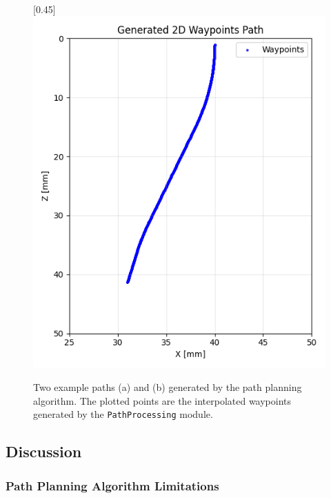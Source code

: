 \begin{figure}[H]
\begin{subcaptionbox}{\label{fig:right}}[0.45\linewidth]
        {\includegraphics[width=\linewidth]{images/waypoints/Figure_1.png}}
    \end{subcaptionbox}
    \caption{Two example paths (a) and (b) generated by the path planning algorithm. The plotted points are the interpolated waypoints generated by the \texttt{PathProcessing} module.}
    \label{fig:waypoints}
\end{figure}

\subsection{Discussion}
\subsubsection{Path Planning Algorithm Limitations}

